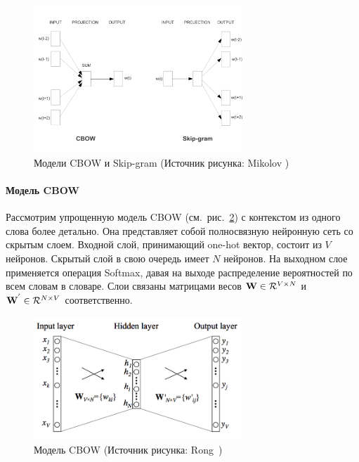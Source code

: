 \begin{figure}[ht]
\centering
\includegraphics[width=0.7\textwidth]{img/efficient-models}
\caption{\label{fig:w2v-models}Модели CBOW и Skip-gram (Источник рисунка: Mikolov \autocite{DBLP:journals/corr/abs-1301-3781})}
\end{figure}

\paragraph{Модель CBOW}

Рассмотрим упрощенную модель CBOW (см.~рис.~\ref{fig:w2v-cbow}) с контекстом из одного слова более детально. Она представляет собой полносвязную нейронную сеть со скрытым слоем. Входной слой, принимающий one-hot вектор, состоит из ${V}$ нейронов. Скрытый слой в свою очередь имеет ${N}$ нейронов. На выходном слое применяется операция Softmax, давая на выходе распределение вероятностей по всем словам в словаре. Слои связаны матрицами весов ${\textbf W} \in \mathcal{R}^{V \times N } $ и ${\textbf W^{'}} \in \mathcal{R}^{N \times V}$ соответственно.

\begin{figure}[ht]
\centering
\includegraphics[width=0.7\textwidth]{img/CBOW.png}
\caption{\label{fig:w2v-cbow}Модель CBOW (Источник рисунка: Rong~\autocite{Rong2014word2vecPL})}
\end{figure}



